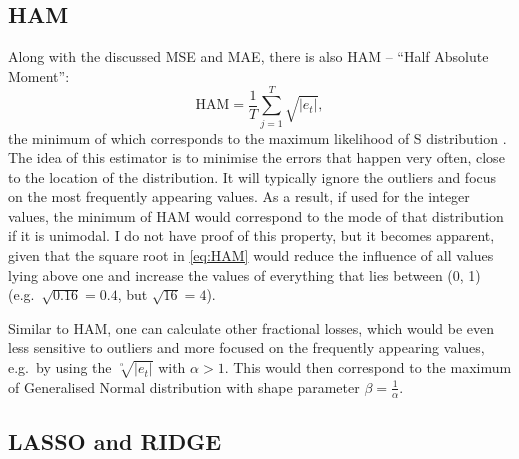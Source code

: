 \documentclass[
]{book}
\theoremstyle{definition}
\theoremstyle{definition}
\theoremstyle{definition}
\theoremstyle{definition}
\theoremstyle{remark}
\begin{document}
\hypertarget{ham}{%
\subsection{HAM}\label{ham}}

Along with the discussed MSE and MAE, there is also HAM -- ``Half Absolute Moment'':
\begin{equation}
  \mathrm{HAM} = \frac{1}{T} \sum_{j=1}^T \sqrt{\left|e_t\right|},
  \label{eq:HAM}
\end{equation}
the minimum of which corresponds to the maximum likelihood of S distribution \citep[see Chapter 3 of][]{SvetunkovSBA}. The idea of this estimator is to minimise the errors that happen very often, close to the location of the distribution. It will typically ignore the outliers and focus on the most frequently appearing values. As a result, if used for the integer values, the minimum of HAM would correspond to the mode of that distribution if it is unimodal. I do not have proof of this property, but it becomes apparent, given that the square root in \eqref{eq:HAM} would reduce the influence of all values lying above one and increase the values of everything that lies between (0, 1) (e.g.~\(\sqrt{0.16}=0.4\), but \(\sqrt{16}=4\)).

Similar to HAM, one can calculate other fractional losses, which would be even less sensitive to outliers and more focused on the frequently appearing values, e.g.~by using the \(\sqrt[^\alpha]{\left|e_t\right|}\) with \(\alpha>1\). This would then correspond to the maximum of Generalised Normal distribution with shape parameter \(\beta=\frac{1}{\alpha}\).

\hypertarget{lasso-and-ridge}{%
\subsection{LASSO and RIDGE}\label{lasso-and-ridge}}
\end{document}
